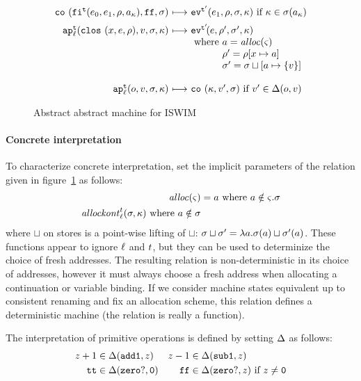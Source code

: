 \documentclass[preprint,onecolumn,9pt]{sigplanconf} %
\begin{document}
\begin{figure}
\begin{gather*}
\begin{array}{@{}r@{\ }c@{\ }l@{}}
\\
\co{\kif[^\mcntr]{\mexpi0,\mexpi1,\menv,\maddr_\mkont},\sfalse,\msto} & \machstep&
\ev[^{\mcntr'}]{\mexpi1,\menv,\msto,\mkont}
\text{ if }\mkont\in\msto(\maddr_\mkont)
\\[2mm]
\ap[^\mcntr_\mlab]{\clos{\mvar,\mexp,\menv},\mval,\msto,\mkont} & \machstep&
\ev[^{\mcntr'}\!]{\mexp,\menv',\msto',\mkont}
\\
&&\text{ where } \maddr  =\alloc(\mstate) \\
&&\phantom{\text{ where }} \menv' = \menv[\mvar\mapsto\maddr] \\
&&\phantom{\text{ where }} \msto' = \msto\sqcup[\maddr\mapsto\{\mval\}] \\
\\
\ap[^\mcntr_\mlab]{\mop,\mval,\msto,\mkont} & \machstep&
\co{\mkont,\mval',\msto}
\text{ if } \mval'\in\interpdelta(\mop,\mval)
\end{array}
\end{gather*}
\caption{Abstract abstract machine for ISWIM}
\label{fig:aam}
\end{figure}


\paragraph{Concrete interpretation} To characterize concrete interpretation, set the implicit
parameters of the relation given in figure~\ref{fig:aam} as follows:
\begin{align*}
\mathit{alloc}(\varsigma) &= a \mbox{ where } a \notin \varsigma.\sigma \\
\mathit{allockont}^{t}_{\ell}(\sigma,\kappa) \mbox{ where } a \notin \sigma
\end{align*}
where $\sqcup$ on stores is a point-wise lifting of $\sqcup$: $\sigma
\sqcup \sigma' = \lambda a. \sigma(a) \sqcup
\sigma'(a)$. These functions appear to ignore ${\ell}$ and
${t}$, but they can be used to determinize the choice of fresh
addresses.  The resulting relation is non-deterministic in its choice
of addresses, however it must always choose a fresh address when
allocating a continuation or variable binding.  If we consider machine
states equivalent up to consistent renaming and fix an allocation
scheme, this relation defines a deterministic machine (the relation is
really a function).

The interpretation of primitive operations is defined by setting
$\Delta$ as follows:
\begin{align*}
z+1 &\in \Delta({\tt add1},z) &
z-1 &\in \Delta({\tt sub1},z)\\
{\tt tt} &\in \Delta({\tt zero?},{\tt 0}) &
{\tt ff} &\in \Delta({\tt zero?},z)\text{ if }z\neq {\tt 0}\\
\end{align*}
\end{document}
